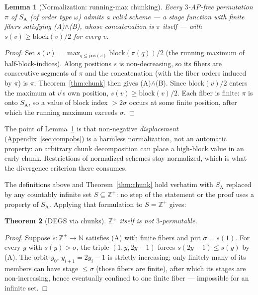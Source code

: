\documentclass[11pt]{article}
\newtheorem{theorem}{Theorem}
\newtheorem{lemma}[theorem]{Lemma}
\theoremstyle{definition}
\newcommand{\Z}{\mathbb{Z}}
\newcommand{\N}{\mathbb{N}}
\newcommand{\SA}{S_{\mathrm{A}}}
\newcommand{\pos}{\mathrm{pos}}
\begin{document}
\begin{lemma}[Normalization: running-max chunking]\label{lem:normal}
Every $3$-AP-free permutation $\pi$ of $\SA$ (of order type $\omega$)
admits a valid scheme --- a stage function with finite fibers satisfying
(A)$\wedge$(B), whose concatenation is $\pi$ itself --- with
$s(v) \ge \mathrm{block}(v)/2$ for every $v$.
\end{lemma}

\begin{proof}
Set $s(v) = \max_{q \le \pos(v)} \mathrm{block}(\pi(q))/2$ (the running
maximum of half-block-indices). Along positions $s$ is non-decreasing, so
its fibers are consecutive segments of $\pi$ and the concatenation (with
the fiber orders induced by $\pi$) is $\pi$; Theorem~\ref{thm:chunk} then
gives (A)$\wedge$(B). Since $\mathrm{block}(v)/2$ enters the maximum at
$v$'s own position, $s(v) \ge \mathrm{block}(v)/2$. Each fiber is finite:
$\pi$ is onto $\SA$, so a value of block index $> 2\sigma$ occurs at some
finite position, after which the running maximum exceeds $\sigma$.
\end{proof}

\noindent The point of Lemma~\ref{lem:normal} is that non-negative
\emph{displacement} (Appendix~\ref{sec:compobs}) is a harmless
normalization, not an
automatic property: an arbitrary chunk decomposition can place a
high-block value in an early chunk. Restrictions of normalized schemes
stay normalized, which is what the divergence criterion there consumes.

The definitions above and Theorem~\ref{thm:chunk} hold verbatim with $\SA$
replaced by any countably infinite set $S \subseteq \Z^+$: no step of the
statement or the proof uses a property of $\SA$. Applying that formulation
to $S = \Z^+$ gives:

\begin{theorem}[DEGS via chunks]\label{thm:degs}
$\Z^+$ itself is not $3$-permutable.
\end{theorem}

\begin{proof}
Suppose $s\colon \Z^+ \to \N$ satisfies
(A) with finite fibers and put $\sigma = s(1)$. For every $y$ with
$s(y) > \sigma$, the triple $(1, y, 2y-1)$ forces $s(2y-1) \le s(y)$ by (A).
The orbit $y_0,\, y_{i+1} = 2y_i - 1$ is strictly increasing; only finitely
many of its members can have stage $\le \sigma$ (those fibers are finite),
after which its stages are non-increasing, hence eventually confined to one
finite fiber --- impossible for an infinite set.
\end{proof}
\end{document}
